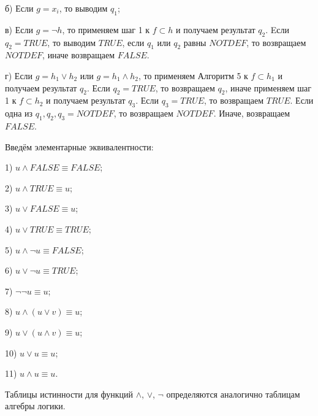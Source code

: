 \documentclass[12pt]{article}
\begin{document}
      б) Если $ g = x_{i}$, то выводим $q_{1}$;
      
      в) Если $ g = \neg h$, то применяем  шаг 1 к  $f\subset h$ и получаем результат $q_{2}$. Eсли $q_{2} = TRUE$, то выводим $TRUE$, если $q_{1}$ или $q_{2}$ равны $NOTDEF$, то возвращаем $NOTDEF$, иначе возвращаем $FALSE$.
      
      г) Если $ g = h_{1} \vee h_{2}$ или  $ g = h_{1} \wedge h_{2}$, то применяем  Алгоритм 5 к  $f\subset h_{1}$   и получаем результат $q_{2}$. Если $q_{2} = TRUE$, то возвращаем $q_{2}$, иначе применяем шаг 1 к $f\subset h_{2}$ и  получаем результат  $q_{3}$. Если $q_{3} = TRUE$, то возвращаем $TRUE$. Если одна из $q_{1}, q_{2}, q_{3} = NOTDEF$, то возвращаем $NOTDEF$. Иначе, возвращаем $FALSE$.
      \\
    
\begin{comment}
    Шаг 1. Если $g = c_{i}$, $g = x_{i}$, то возвращаем результат \hyperlink{a3}{ \textcolor{red}{Алгоритма 4}}. Иначе переходим к шагу 2.
  
    Шаг 2.  Если $f = \neg f_{1}$ $g = \neg g_{1}$, то применяем шаг 1 к $f_{1}$ и  $g_{1}$. Если $f$ имеет другой вид, то применяем шаг 1 к $f$ и  $g$.
     Если $g$ имеет другой вид, то переходим к шагу 3.
  
     Шаг 3. Если $g = g_{1} \wedge g_{2}$, то если \hyperlink{a4}{\textcolor{red}{Алгоритм 4}} дает $TRUE$
  \\
\end{comment}
     
     Введём элементарные эквивалентности:
     
     1) $u\wedge  FALSE\equiv FALSE$;
     
     2) $u\wedge TRUE\equiv u$;
     
     3) $u\vee FALSE\equiv u$;
     
     4) $u\vee TRUE\equiv TRUE$;
     
     5) $u \wedge \neg u \equiv FALSE$;
     
     6) $u \vee \neg u \equiv TRUE$;
     
     7) $\neg \neg u \equiv u$;
     
     8) $u\wedge (u \vee v)\equiv u$;
     
     9) $u\vee (u \wedge v)\equiv u$;
     
     10) $u \vee u \equiv u$;
     
     11) $u \wedge u \equiv u$.
     
     Таблицы истинности для функций $\wedge$, $\vee$, $\neg$ определяются аналогично таблицам алгебры логики.
     \\
     
\end{document}
